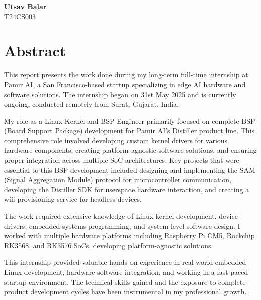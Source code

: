 \documentclass[12pt,a4paper]{report}
\begin{document}
\vspace{2cm}

\begin{flushright}
\textbf{Utsav Balar} \\
T24CS003
\end{flushright}

\newpage
\chapter*{Abstract}

\vspace{1cm}

This report presents the work done during my long-term full-time internship at Pamir AI, a San Francisco-based startup specializing in edge AI hardware and software solutions. The internship began on 31st May 2025 and is currently ongoing, conducted remotely from Surat, Gujarat, India.

\vspace{0.5cm}

My role as a Linux Kernel and BSP Engineer primarily focused on complete BSP (Board Support Package) development for Pamir AI's Distiller product line. This comprehensive role involved developing custom kernel drivers for various hardware components, creating platform-agnostic software solutions, and ensuring proper integration across multiple SoC architectures. Key projects that were essential to this BSP development included designing and implementing the SAM (Signal Aggregation Module) protocol for microcontroller communication, developing the Distiller SDK for userspace hardware interaction, and creating a wifi provisioning service for headless devices.

\vspace{0.5cm}

The work required extensive knowledge of Linux kernel development, device drivers, embedded systems programming, and system-level software design. I worked with multiple hardware platforms including Raspberry Pi CM5, Rockchip RK3568, and RK3576 SoCs, developing platform-agnostic solutions.

\vspace{0.5cm}

This internship provided valuable hands-on experience in real-world embedded Linux development, hardware-software integration, and working in a fast-paced startup environment. The technical skills gained and the exposure to complete product development cycles have been instrumental in my professional growth.
\end{document}
